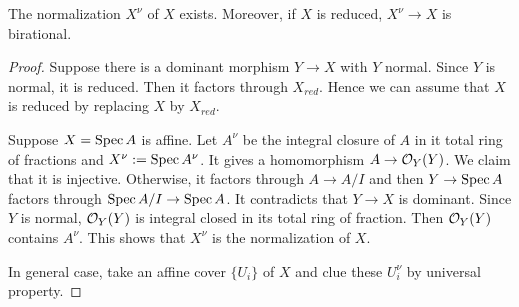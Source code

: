     \begin{proposition}
        The normalization $X^\nu$ of $X$ exists.
        Moreover, if $X$ is reduced, $X^\nu \to X$ is birational.
    \end{proposition}
    \begin{proof}
        Suppose there is a dominant morphism $Y \to X$ with $Y$ normal.
        Since $Y$ is normal, it is reduced.
        Then it factors through $X_{red}$.
        Hence we can assume that $X$ is reduced by replacing $X$ by $X_{red}$.

        Suppose $X = \operatorname{Spec} A$ is affine.
        Let $A^\nu$ be the integral closure of $A$ in it total ring of fractions and $X^\nu := \operatorname{Spec} A^\nu$.
        It gives a homomorphism $A \to {\mathcal{O}}_Y(Y)$.
        We claim that it is injective.
        Otherwise, it factors through $A \to A/I$ and then $Y \to \operatorname{Spec} A$ factors through $\operatorname{Spec} A/I \to \operatorname{Spec} A$.
        It contradicts that $Y \to X$ is dominant.
        Since $Y$ is normal, ${\mathcal{O}}_Y(Y)$ is integral closed in its total ring of fraction.
        Then ${\mathcal{O}}_Y(Y)$ contains $A^\nu$.
        This shows that $X^\nu$ is the normalization of $X$.

        In general case, take an affine cover $\{U_i\}$ of $X$ and clue these $U_i^\nu$ by universal property.
    \end{proof}



